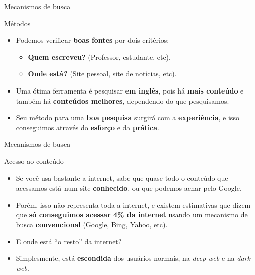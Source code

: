 \begin{frame}{Mecanismos de busca}
	\begin{block}{Métodos}
		\begin{itemize}
			\item Podemos verificar \textbf{boas fontes} por dois critérios:
			      \begin{itemize}
				      \item\normalsize \textbf{Quem escreveu?} (Professor, estudante, etc).
				      \item\normalsize \textbf{Onde está?} (Site pessoal, site de notícias, etc).
			      \end{itemize}
			\item Uma ótima ferramenta é pesquisar \textbf{em inglês}, pois há \textbf{mais conteúdo} e também há \textbf{conteúdos melhores}, dependendo do que pesquisamos.
			\item Seu método para uma \textbf{boa pesquisa }surgirá com a \textbf{experiência}, e isso conseguimos através do \textbf{esforço} e da \textbf{prática}.
		\end{itemize}
	\end{block}

\end{frame}


\begin{frame}{Mecanismos de busca}
	\begin{block}{Acesso ao conteúdo}
		\begin{itemize}
			\item Se você usa bastante a internet, sabe que quase todo o conteúdo que acessamos está num site \textbf{conhecido}, ou que podemos achar pelo Google.
			\item Porém, isso não representa toda a internet, e existem estimativas que dizem que \textbf{só conseguimos acessar 4\% da internet }usando um mecanismo de busca \textbf{convencional }(Google, Bing, Yahoo, etc).
			\item E onde está ``o resto'' da internet?
			\item Simplesmente, está \textbf{escondida} dos usuários normais, na \textit{deep web} e na \textit{dark web}.
		\end{itemize}
	\end{block}

\end{frame}


